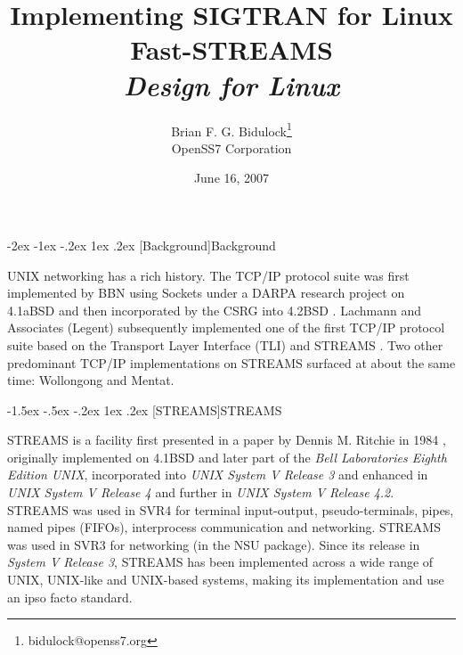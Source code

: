 \documentclass[letterpaper,final,notitlepage,twocolumn,10pt,twoside]{article}
\makeatletter
\let\large = \normalsize
\let\normalsize = \small
\let\small = \footnotesize
\let\footnotesize = \scriptsize
\let\scriptsize = \tiny
\renewcommand\section{\@startsection {section}{1}{\z@}%
                                   {-2ex \@plus -1ex \@minus -.2ex}%
                                   {1ex \@plus .2ex}%
                                   {\normalfont\large\bfseries}}
\renewcommand\subsection{\@startsection{subsection}{2}{\z@}%
                                     {-1.5ex \@plus -.5ex \@minus -.2ex}%
                                     {1ex \@plus .2ex}%
                                     {\normalfont\normalsize\bfseries}}
\makeatother
\begin{document}

\title{Implementing SIGTRAN for Linux Fast-STREAMS\\[0.5ex]
	{\large \textsl{Design for Linux}}}
\author{Brian F. G. Bidulock\thanks{bidulock@openss7.org}\\
	OpenSS7 Corporation}
\date{June 16, 2007}
\maketitle

\begin{abstract}
\end{abstract}


\section[Background]{Background}

UNIX networking has a rich history.  The TCP/IP protocol suite was first
implemented by BBN using Sockets under a DARPA research project on 4.1aBSD and
then incorporated by the CSRG into 4.2BSD \cite[]{bsd}.  Lachmann and
Associates (Legent) subsequently implemented one of the first TCP/IP protocol
suite based on the Transport Layer Interface (TLI) \cite[]{tli} and STREAMS
\cite[]{magic}.  Two other predominant TCP/IP implementations on STREAMS
surfaced at about the same time: Wollongong and Mentat.

\subsection[STREAMS]{STREAMS}

STREAMS is a facility first presented in a paper by Dennis M. Ritchie in 1984
\cite[]{Ritchie84}, originally implemented on 4.1BSD and later part of the
\textsl{Bell Laboratories Eighth Edition UNIX}, incorporated into \textsl{UNIX
System V Release 3} and enhanced in \textsl{UNIX System V Release 4} and
further in \textsl{UNIX System V Release 4.2}.  STREAMS was used in SVR4 for
terminal input-output, pseudo-terminals, pipes, named pipes (FIFOs),
interprocess communication and networking.  STREAMS was used in SVR3 for
networking (in the NSU package).  Since its release in \textsl{System V
Release 3}, STREAMS has been implemented across a wide range of UNIX,
UNIX-like and UNIX-based systems, making its implementation and use an ipso
facto standard.
\end{document}
